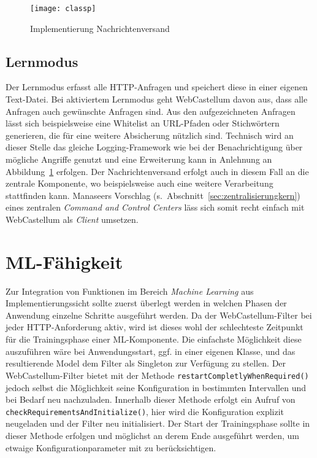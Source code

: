 \begin{figure}[h]
  \begin{center}
    \texttt{[image: classp]}
    \caption{Implementierung Nachrichtenversand}
    \label{fig.impversand}
  \end{center}
\end{figure}

\subsection{Lernmodus}
\label{sec:lernmodus}
Der Lernmodus erfasst alle HTTP-Anfragen und speichert diese in einer eigenen Text-Datei. Bei aktiviertem Lernmodus geht WebCastellum davon aus, dass alle Anfragen auch gewünschte Anfragen sind. Aus den aufgezeichneten Anfragen lässt sich beispielsweise eine Whitelist an URL-Pfaden oder Stichwörtern generieren, die für eine weitere Absicherung nützlich sind. Technisch wird an dieser Stelle das gleiche Logging-Framework wie bei der Benachrichtigung über mögliche Angriffe genutzt und eine Erweiterung kann in Anlehnung an Abbildung~\ref{fig.impversand} erfolgen. Der Nachrichtenversand erfolgt auch in diesem Fall an die zentrale Komponente, wo beispielsweise auch eine weitere Verarbeitung stattfinden kann. Manaseers Vorschlag (s.~Abschnitt~\ref{sec:zentralisierungkern}) eines zentralen \glqq\emph{Command and Control Centers}\grqq{} läss sich somit recht einfach mit WebCastellum als \emph{Client} umsetzen.


\section{ML-Fähigkeit}
\label{sec:mlfk}

Zur Integration von Funktionen im Bereich \emph{Machine Learning} aus Implementierungssicht sollte zuerst überlegt werden in welchen Phasen der Anwendung einzelne Schritte ausgeführt werden. Da der WebCastellum-Filter bei jeder HTTP-Anforderung aktiv, wird ist dieses wohl der schlechteste Zeitpunkt für die Trainingsphase einer ML-Komponente. Die einfachste Möglichkeit diese auszuführen wäre bei Anwendungsstart, ggf. in einer eigenen Klasse, und das resultierende Model dem Filter als Singleton zur Verfügung zu stellen. Der WebCastellum-Filter bietet mit der Methode \verb=restartCompletlyWhenRequired()= jedoch selbst die Möglichkeit seine Konfiguration in bestimmten Intervallen und bei Bedarf neu nachzuladen. Innerhalb dieser Methode erfolgt ein Aufruf von \verb=checkRequirementsAndInitialize()=, hier wird die Konfiguration explizit neugeladen und der Filter neu initialisiert. Der Start der Trainingsphase sollte in dieser Methode erfolgen und möglichst an derem Ende ausgeführt werden, um etwaige Konfigurationparameter mit zu berücksichtigen.\\

